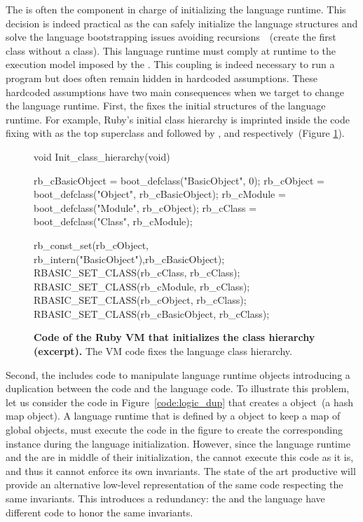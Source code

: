 The \VM is often the component in charge of initializing the language runtime. This decision is indeed practical as the \VM can safely initialize the language structures and solve the language bootstrapping issues avoiding recursions~\cite{Kicz91a}~(\eg create the first class without a class). This language runtime must comply at runtime to the execution model imposed by the \VM. This coupling is indeed necessary to run a program but does often remain hidden in hardcoded assumptions. These hardcoded \VM assumptions have two main consequences when we target to change the language runtime. First, the \VM fixes the initial structures of the language runtime. For example, Ruby's initial class hierarchy is imprinted inside the \VM code fixing with  as the top superclass and followed by ,  and  respectively~(Figure \ref{code:ruby_hierarchy}).

\begin{figure}[ht!]
\begin{code}
void Init_class_hierarchy(void) {
    rb_cBasicObject = boot_defclass("BasicObject", 0);
    rb_cObject = boot_defclass("Object", rb_cBasicObject);
    rb_cModule = boot_defclass("Module", rb_cObject);
    rb_cClass =  boot_defclass("Class",  rb_cModule);

    rb_const_set(rb_cObject, rb_intern("BasicObject"),rb_cBasicObject);
    RBASIC_SET_CLASS(rb_cClass, rb_cClass);
    RBASIC_SET_CLASS(rb_cModule, rb_cClass);
    RBASIC_SET_CLASS(rb_cObject, rb_cClass);
    RBASIC_SET_CLASS(rb_cBasicObject, rb_cClass);
}
\end{code}
\caption{\textbf{Code of the Ruby VM that initializes the class hierarchy (excerpt).} The VM code fixes the language class hierarchy.\label{code:ruby_hierarchy}}
\end{figure}

Second, the \VM includes code to manipulate language runtime objects introducing a duplication between the \VM code and the language code. To illustrate this problem, let us consider the code in Figure~\ref{code:logic_dup} that creates a  object~(a hash map object). A language runtime that is defined by a  object to keep \eg a map of global objects, must execute the code in the figure to create the corresponding instance during the language initialization. However, since the language runtime and the \VM are in middle of their initialization, the \VM cannot execute this code as it is, and thus it cannot enforce its own invariants. The state of the art productive \VMs will provide an alternative low-level representation of the same code respecting the same invariants. This introduces a redundancy: the \VM and the language have different code to honor the same invariants.

